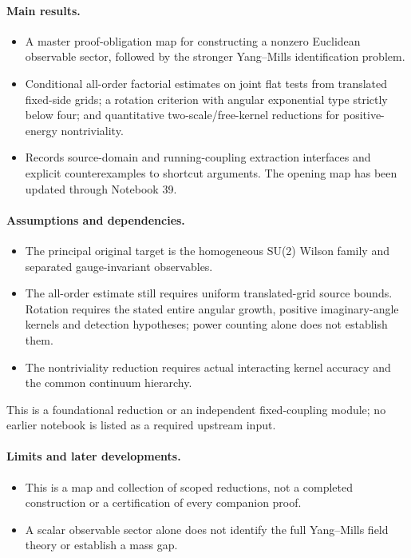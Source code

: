 \documentclass[11pt]{article}
\theoremstyle{remark}
\begin{document}
\paragraph{Main results.}
\begin{itemize}
\item A master proof-obligation map for constructing a nonzero Euclidean observable sector, followed by the stronger Yang--Mills identification problem.
\item Conditional all-order factorial estimates on joint flat tests from translated fixed-side grids; a rotation criterion with angular exponential type strictly below four; and quantitative two-scale/free-kernel reductions for positive-energy nontriviality.
\item Records source-domain and running-coupling extraction interfaces and explicit counterexamples to shortcut arguments. The opening map has been updated through Notebook 39.
\end{itemize}

\paragraph{Assumptions and dependencies.}
\begin{itemize}
\item The principal original target is the homogeneous SU(2) Wilson family and separated gauge-invariant observables.
\item The all-order estimate still requires uniform translated-grid source bounds. Rotation requires the stated entire angular growth, positive imaginary-angle kernels and detection hypotheses; power counting alone does not establish them.
\item The nontriviality reduction requires actual interacting kernel accuracy and the common continuum hierarchy.
\end{itemize}

This is a foundational reduction or an independent fixed-coupling module; no earlier notebook is listed as a required upstream input.\par

\paragraph{Limits and later developments.}
\begin{itemize}
\item This is a map and collection of scoped reductions, not a completed construction or a certification of every companion proof.
\item A scalar observable sector alone does not identify the full Yang--Mills field theory or establish a mass gap.
\end{itemize}
\end{document}
